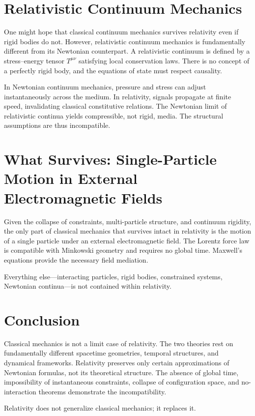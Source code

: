 \documentclass[12pt]{article}
\begin{document}
\section{Relativistic Continuum Mechanics}
One might hope that classical continuum mechanics survives relativity even if rigid bodies do not. However, relativistic continuum mechanics is fundamentally different from its Newtonian counterpart. A relativistic continuum is defined by a stress--energy tensor $T^{\mu\nu}$ satisfying local conservation laws. There is no concept of a perfectly rigid body, and the equations of state must respect causality.

In Newtonian continuum mechanics, pressure and stress can adjust instantaneously across the medium. In relativity, signals propagate at finite speed, invalidating classical constitutive relations. The Newtonian limit of relativistic continua yields compressible, not rigid, media. The structural assumptions are thus incompatible.

\section{What Survives: Single-Particle Motion in External Electromagnetic Fields}
Given the collapse of constraints, multi-particle structure, and continuum rigidity, the only part of classical mechanics that survives intact in relativity is the motion of a single particle under an external electromagnetic field. The Lorentz force law is compatible with Minkowski geometry and requires no global time. Maxwell's equations provide the necessary field mediation.

Everything else---interacting particles, rigid bodies, constrained systems, Newtonian continua---is not contained within relativity.

\section{Conclusion}
Classical mechanics is not a limit case of relativity. The two theories rest on fundamentally different spacetime geometries, temporal structures, and dynamical frameworks. Relativity preserves only certain approximations of Newtonian formulas, not its theoretical structure. The absence of global time, impossibility of instantaneous constraints, collapse of configuration space, and no-interaction theorems demonstrate the incompatibility.

Relativity does not generalize classical mechanics; it replaces it.
\end{document}
